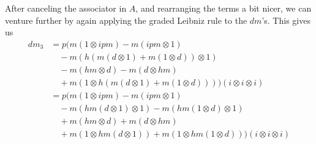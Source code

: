 After canceling the associator in $A$, and rearranging the terms a bit nicer, we can venture further by again applying the graded Leibniz rule to the $dm$'s. This gives us
\begin{align*}
    dm_3 
    &=
    p(m(1\otimes ipm)-m(ipm\otimes 1) \\
    &\quad -m(h(m(d\otimes 1)+m(1\otimes d))\otimes 1) \\
    &\quad -m(hm\otimes d)-m(d\otimes hm) \\
    &\quad +m(1\otimes h(m(d\otimes 1)+m(1\otimes d))))(i\otimes i\otimes i) \\
    &=
    p(m(1\otimes ipm)-m(ipm\otimes 1) \\
    &\quad - m(hm(d\otimes 1)\otimes 1) - m(hm(1\otimes d)\otimes 1) \\
    &\quad +m(hm\otimes d)+m(d\otimes hm) \\
    &\quad +m(1\otimes hm(d\otimes 1))+m(1\otimes hm(1\otimes d)))(i\otimes i\otimes i)
\end{align*}

